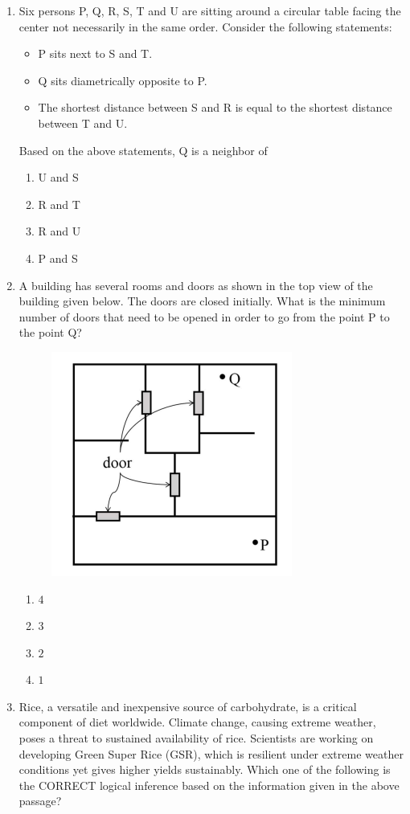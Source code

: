 \documentclass[journal,12pt,onecolumn]{IEEEtran}
\theoremstyle{remark}
\begin{document}
\begin{enumerate}
\item Six persons P, Q, R, S, T and U are sitting around a circular table facing the center not necessarily in the same order. Consider the following statements:
\begin{itemize}
\item P sits next to S and T.
\item Q sits diametrically opposite to P.
\item The shortest distance between S and R is equal to the shortest distance between T and U.
\end{itemize}
Based on the above statements, Q is a neighbor of

\hfill{}
\begin{enumerate}
\item U and S
\item R and T
\item R and U
\item P and S
\end{enumerate}

\item A building has several rooms and doors as shown in the top view of the building given below. The doors are closed initially. What is the minimum number of doors that need to be opened in order to go from the point P to the point Q?

\hfill{}
\begin{figure}[H]
\includegraphics[width = 0.5\columnwidth]{q5}
\caption*{}
\label{q5}
\end{figure}
\begin{enumerate}
\item $4$
\item $3$
\item $2$
\item $1$
\end{enumerate}

\item Rice, a versatile and inexpensive source of carbohydrate, is a critical component of diet worldwide. Climate change, causing extreme weather, poses a threat to sustained availability of rice. Scientists are working on developing Green Super Rice (GSR), which is resilient under extreme weather conditions yet gives higher yields sustainably. Which one of the following is the CORRECT logical inference based on the information given in the above passage?


\end{enumerate}
\end{document}
